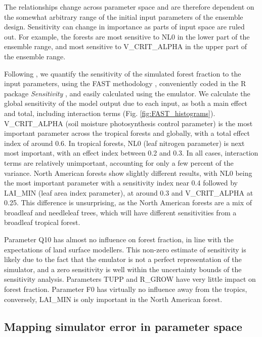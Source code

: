 \documentclass[esd, article]{copernicus} %
\begin{document}
The relationships change across parameter space and are therefore dependent on the somewhat arbitrary range of the initial input parameters of the ensemble design. Sensitivity can change in importance as parts of input space are ruled out. For example, the forests are most sensitive to NL0 in the lower part of the ensemble range, and most sensitive to V\_CRIT\_ALPHA in the upper part of the ensemble range.


Following \citep{carslaw2013large}, we quantify the sensitivity of the simulated forest fraction to the input parameters, using the FAST methodology \citep{saltelli1999sensitivity}, conveniently coded in the R package \emph{Sensitivity} \citep{Rpackage2015sensitivity}, and easily calculated using the emulator. We calculate the global sensitivity of the model output due to each input, as both a main effect and total, including interaction terms (Fig.  \ref{fig:FAST_histograms}). V\_CRIT\_ALPHA (soil moisture photosynthesis control parameter) is the most important parameter across the tropical forests and globally, with a total effect index of around 0.6. In tropical forests, NL0 (leaf nitrogen parameter) is next most important, with an effect index between 0.2 and 0.3. In all cases, interaction terms are relatively unimportant, accounting for only a few percent of the variance. North American forests show slightly different results, with NL0 being the most important parameter with a sensitivity index near 0.4 followed by LAI\_MIN (leaf area index parameter), at around 0.3 and V\_CRIT\_ALPHA at 0.25. This difference is unsurprising, as the North American forests are a mix of broadleaf and needleleaf trees, which will have different sensitivities from a broadleaf tropical forest.


Parameter Q10 has almost no influence on forest fraction, in line with the expectations of land surface modellers. This non-zero estimate of sensitivity is likely due to the fact that the emulator is not a perfect representation of the simulator, and a zero sensitivity is well within the uncertainty bounds of the sensitivity analysis. Parameters TUPP and R\_GROW have very little impact on forest fraction. Parameter F0 has virtually no influence away from the tropics, conversely, LAI\_MIN is only important in the North American forest.


\subsection{Mapping simulator error in parameter space}\label{ssec:mapping}
\end{document}
